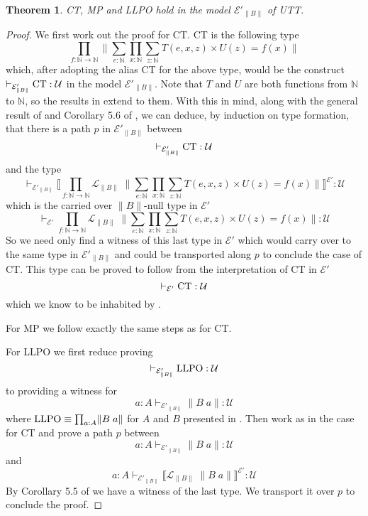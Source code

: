\documentclass[12pt]{report}
\newtheorem{thm}{Theorem}[chapter]
\theoremstyle{definition}
\begin{document}
\begin{thm}
CT, MP and LLPO hold in the model $\mathcal{E}'_{\lVert B \rVert}$ of UTT.
\end{thm}
\begin{proof}
We first work out the proof for CT. 
CT is the following type
$$\prod_{f : \mathbb{N}\rightarrow \mathbb{N}} \Big\lVert \sum_{e : \mathbb{N}} \prod_{x : \mathbb{N}} \sum_{z : \mathbb{N}} T(e,x,z) \times U(z) = f(x) \Big\rVert$$
which, after adopting the alias CT for the above type, would be the construct $\vdash_{\mathcal{E}'_{\lVert B \rVert}} \textnormal{CT} : \mathcal{U}$ in the model $\mathcal{E}'_{\lVert B \rVert}$. 
Note that $T$ and $U$ are both functions from $\mathbb{N}$ to $\mathbb{N}$, so the results in  extend to them. 
With this in mind, along with the general result of  and Corollary 5.6 of \cite{1905.03014}, we can deduce, by induction on type formation, that there is a path $p$ in $\mathcal{E}'_{\lVert B \rVert}$ between 
$$\vdash_{\mathcal{E}'_{\lVert B \rVert}} \textnormal{CT} : \mathcal{U}$$ 
and the type 
$$\vdash_{\mathcal{E}'_{\lVert B \rVert}} \bigg\llbracket \prod_{f : \mathbb{N}\rightarrow \mathbb{N}} \mathcal{L}_{\lVert B \rVert}\;\Big\lVert \sum_{e : \mathbb{N}} \prod_{x : \mathbb{N}} \sum_{z : \mathbb{N}} T(e,x,z) \times U(z) = f(x) \Big\rVert \bigg\rrbracket^{\mathcal{E}'} : \mathcal{U}$$
which is the carried over $\lVert B \rVert$-null type in $\mathcal{E}'$
$$\vdash_{\mathcal{E}'} \prod_{f : \mathbb{N}\rightarrow \mathbb{N}} \mathcal{L}_{\lVert B \rVert}\;\Big\lVert \sum_{e : \mathbb{N}} \prod_{x : \mathbb{N}} \sum_{z : \mathbb{N}} T(e,x,z) \times U(z) = f(x) \Big\rVert : \mathcal{U}$$ 
So we need only find a witness of this last type in $\mathcal{E}'$ which would carry over to the same type in $\mathcal{E}'_{\lVert B \rVert}$ and could be transported along $p$ to conclude the case of CT. 
This type can be proved to follow from the interpretation of CT in $\mathcal{E}'$ 
$$\vdash_{\mathcal{E}'} \textnormal{CT} : \mathcal{U}$$
which we know to be inhabited by . 

For MP we follow exactly the same steps as for CT. 

For LLPO we first reduce proving 
$$\vdash_{\mathcal{E}'_{\lVert B \rVert}} \textnormal{LLPO} : \mathcal{U}$$
to providing a witness for 
$$a : A \vdash_{\mathcal{E}'_{\lVert B \rVert}} \lVert B\;a\rVert : \mathcal{U}$$
where $\textnormal{LLPO} \equiv \prod_{a : A}\lVert B\;a \rVert$ for $A$ and $B$ presented in . 
Then work as in the case for CT and prove a path $p$ between
$$a : A \vdash_{\mathcal{E}'_{\lVert B \rVert}} \lVert B\;a\rVert : \mathcal{U}$$
and
$$a : A \vdash_{\mathcal{E}'_{\lVert B \rVert}} \big\llbracket \mathcal{L}_{\lVert B \rVert}\; \lVert B\;a\rVert \big\rrbracket^{\mathcal{E}'} : \mathcal{U}$$
By Corollary 5.5 of \cite{1905.03014} we have a witness of the last type. 
We transport it over $p$ to conclude the proof. 
\end{proof}
\end{document}
